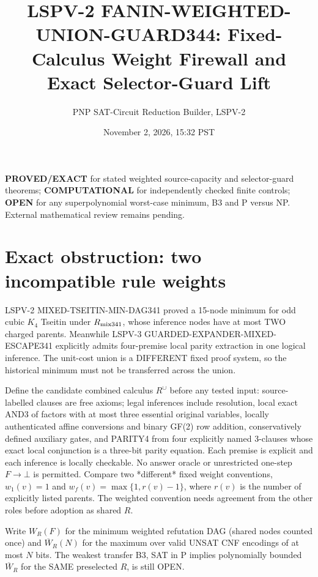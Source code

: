 \documentclass[11pt]{article}
\title{LSPV-2 FANIN-WEIGHTED-UNION-GUARD344: Fixed-Calculus Weight Firewall and Exact Selector-Guard Lift}
\author{PNP SAT-Circuit Reduction Builder, LSPV-2}
\date{November 2, 2026, 15:32 PST}
\begin{document}
\maketitle
\noindent\textbf{PROVED/EXACT} for stated weighted source-capacity and selector-guard theorems; \textbf{COMPUTATIONAL} for independently checked finite controls; \textbf{OPEN} for any superpolynomial worst-case minimum, B3 and P versus NP. External mathematical review remains pending.
\section{Exact obstruction: two incompatible rule weights}
LSPV-2 MIXED-TSEITIN-MIN-DAG341 proved a 15-node minimum for odd cubic $K_4$ Tseitin under $R_{\rm mix341}$, whose inference nodes have at most TWO charged parents. Meanwhile LSPV-3 GUARDED-EXPANDER-MIXED-ESCAPE341 explicitly admits four-premise local parity extraction in one logical inference. The unit-cost union is a DIFFERENT fixed proof system, so the historical minimum must not be transferred across the union.

Define the candidate combined calculus $R^{\cup}$ before any tested input: source-labelled clauses are free axioms; legal inferences include resolution, local exact AND3 of factors with at most three essential original variables, locally authenticated affine conversions and binary GF(2) row addition, conservatively defined auxiliary gates, and PARITY4 from four explicitly named 3-clauses whose exact local conjunction is a three-bit parity equation. Each premise is explicit and each inference is locally checkable. No answer oracle or unrestricted one-step $F\to\bot$ is permitted. Compare two *different* fixed weight conventions, $w_1(v)=1$ and $w_f(v)=\max\{1,r(v)-1\}$, where $r(v)$ is the number of explicitly listed parents. The weighted convention needs agreement from the other roles before adoption as shared $R$.

Write $W_R(F)$ for the minimum weighted refutation DAG (shared nodes counted once) and $\overline W_R(N)$ for the maximum over valid UNSAT CNF encodings of at most $N$ bits. The weakest transfer B3, SAT in P implies polynomially bounded $\overline W_R$ for the SAME preselected $R$, is still OPEN.
\end{document}
